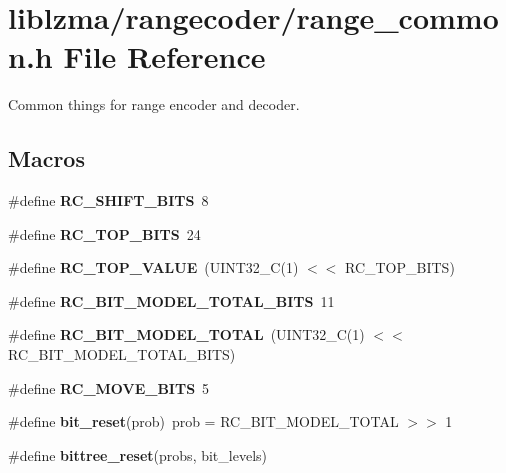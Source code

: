\section{liblzma/rangecoder/range\-\_\-common.h File Reference}
\label{range__common_8h}


Common things for range encoder and decoder.  


\subsection*{Macros}
\begin{DoxyCompactItemize}
\item 
\#define {\bfseries R\-C\-\_\-\-S\-H\-I\-F\-T\-\_\-\-B\-I\-T\-S}~8\label{range__common_8h_a41c53be1dc32cfb1a4d53b141a60815c}

\item 
\#define {\bfseries R\-C\-\_\-\-T\-O\-P\-\_\-\-B\-I\-T\-S}~24\label{range__common_8h_a1a1ca7b414fb34f9886d03df2a3bdc81}

\item 
\#define {\bfseries R\-C\-\_\-\-T\-O\-P\-\_\-\-V\-A\-L\-U\-E}~(U\-I\-N\-T32\-\_\-\-C(1) $<$$<$ R\-C\-\_\-\-T\-O\-P\-\_\-\-B\-I\-T\-S)\label{range__common_8h_a43771f3c7667e9d8a2bba4f0f0c35a0d}

\item 
\#define {\bfseries R\-C\-\_\-\-B\-I\-T\-\_\-\-M\-O\-D\-E\-L\-\_\-\-T\-O\-T\-A\-L\-\_\-\-B\-I\-T\-S}~11\label{range__common_8h_a38bbe381d456abee5209c427f2625586}

\item 
\#define {\bfseries R\-C\-\_\-\-B\-I\-T\-\_\-\-M\-O\-D\-E\-L\-\_\-\-T\-O\-T\-A\-L}~(U\-I\-N\-T32\-\_\-\-C(1) $<$$<$ R\-C\-\_\-\-B\-I\-T\-\_\-\-M\-O\-D\-E\-L\-\_\-\-T\-O\-T\-A\-L\-\_\-\-B\-I\-T\-S)\label{range__common_8h_aeafdaaf760f1363a9cd15f25b9679b27}

\item 
\#define {\bfseries R\-C\-\_\-\-M\-O\-V\-E\-\_\-\-B\-I\-T\-S}~5\label{range__common_8h_a411055e99baf222f4ba1d3ad8c2a84cc}

\item 
\#define {\bfseries bit\-\_\-reset}(prob)~prob = R\-C\-\_\-\-B\-I\-T\-\_\-\-M\-O\-D\-E\-L\-\_\-\-T\-O\-T\-A\-L $>$$>$ 1\label{range__common_8h_a8346b42d317c2f316c17fc468ae86860}

\item 
\#define {\bfseries bittree\-\_\-reset}(probs, bit\-\_\-levels)
\end{DoxyCompactItemize}
